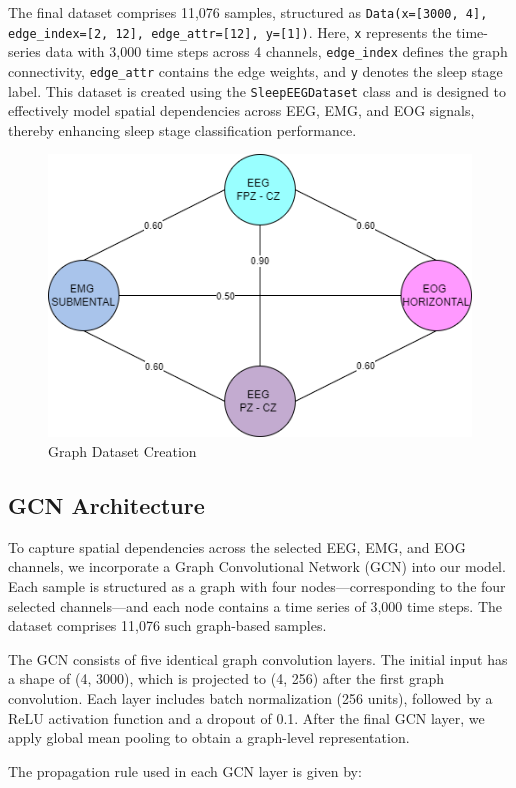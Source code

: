 The final dataset comprises 11,076 samples, structured as \texttt{Data(x=[3000, 4], edge\_index=[2, 12], edge\_attr=[12], y=[1])}. Here, \texttt{x} represents the time-series data with 3,000 time steps across 4 channels, \texttt{edge\_index} defines the graph connectivity, \texttt{edge\_attr} contains the edge weights, and \texttt{y} denotes the sleep stage label. This dataset is created using the \texttt{SleepEEGDataset} class and is designed to effectively model spatial dependencies across EEG, EMG, and EOG signals, thereby enhancing sleep stage classification performance.


\begin{figure}
	\centering
	\includegraphics[width=0.7\linewidth]{"img/paper_3/Graph Weightage"}
	\caption{Graph Dataset Creation}
	\label{fig:graph-weightage}
\end{figure}

\subsection{GCN Architecture}

To capture spatial dependencies across the selected EEG, EMG, and EOG channels, we incorporate a Graph Convolutional Network (GCN) into our model. Each sample is structured as a graph with four nodes—corresponding to the four selected channels—and each node contains a time series of 3,000 time steps. The dataset comprises 11,076 such graph-based samples.

The GCN consists of five identical graph convolution layers. The initial input has a shape of (4, 3000), which is projected to (4, 256) after the first graph convolution. Each layer includes batch normalization (256 units), followed by a ReLU activation function and a dropout of 0.1. After the final GCN layer, we apply global mean pooling to obtain a graph-level representation.

The propagation rule used in each GCN layer is given by:

